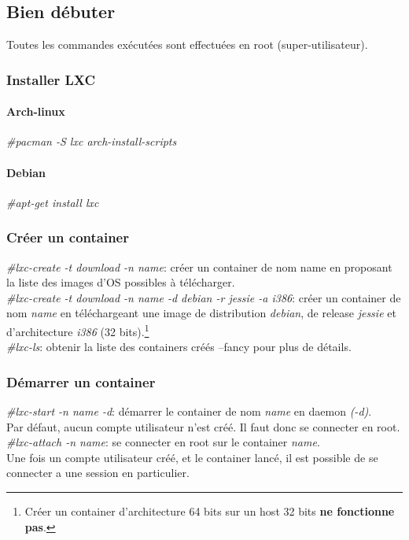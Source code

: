 

\subsection{Bien d\'ebuter}
Toutes les commandes ex\'ecut\'ees sont effectu\'ees en root (super-utilisateur).

\subsubsection{Installer LXC}
\paragraph{Arch-linux}
\emph{\#pacman -S lxc arch-install-scripts}
\paragraph{Debian}
\emph{\#apt-get install lxc}

\subsubsection{Cr\'eer un container}
\emph{\#lxc-create -t download -n name}: cr\'eer un container de nom name en proposant la liste des images d'OS possibles \`a t\'el\'echarger.\\ 

\emph{\#lxc-create -t download -n name -d debian -r jessie -a i386}: cr\'eer un container de nom \emph{name} en t\'el\'echargeant une image de distribution \emph{debian}, de release \emph{jessie} et d'architecture \emph{i386} (32 bits).\footnote{Cr\'eer un container d'architecture 64 bits sur un host 32 bits \textbf{ne fonctionne pas}.}\\

\emph{\#lxc-ls}: obtenir la liste des containers cr\'e\'es --fancy pour plus de d\'etails.\\
  
\subsubsection{D\'emarrer un container}
\emph{\#lxc-start -n name  -d}: d\'emarrer le container de nom \emph{name} en daemon \emph{(-d)}.\\
Par d\'efaut, aucun compte utilisateur n'est cr\'e\'e. Il faut donc se connecter en root.\\ 

\emph{\#lxc-attach -n name}: se connecter en root sur le container \emph{name}.\\
Une fois un compte utilisateur cr\'e\'e, et le container lanc\'e, il est possible de se connecter a une session en particulier.\\

